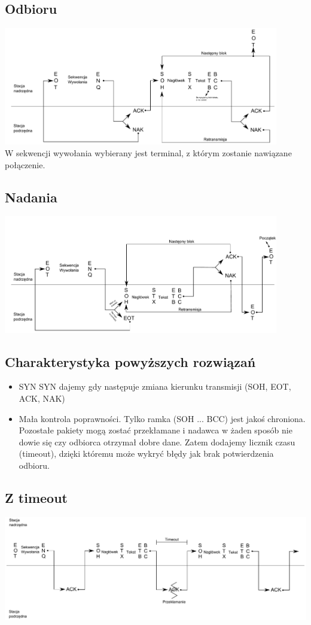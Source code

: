 \documentclass[a4paper,twoside]{article}
\begin{document}
	\subsection{Odbioru}
	\includegraphics[width=12cm]{./images/image06.pdf} \\
	W sekwencji wywołania wybierany jest terminal, z którym zostanie nawiązane połączenie.
	\subsection{Nadania}
	\includegraphics[width=12cm]{./images/image07.pdf}
	\subsection{Charakterystyka powyższych rozwiązań}
	\begin{itemize}
		\item SYN SYN dajemy gdy następuje zmiana kierunku transmisji (SOH, EOT, ACK, NAK)
		\item Mała kontrola poprawności. Tylko ramka (SOH ... BCC) jest jakoś chroniona. Pozostałe pakiety mogą zostać przekłamane i nadawca w żaden sposób nie dowie się czy odbiorca otrzymał dobre dane. Zatem dodajemy licznik czasu (timeout), dzięki któremu może wykryć błędy jak brak potwierdzenia odbioru.
	\end{itemize}
	\subsection{Z timeout}
	\includegraphics[width=14cm]{./images/image08.pdf}
\end{document}
